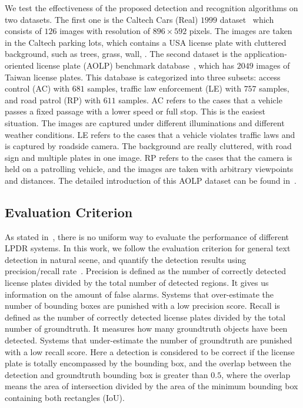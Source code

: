 \documentclass[twocolumn]{svjour3}
\begin{document}
We test the effectiveness of the proposed detection and recognition algorithms on two datasets. The first one is the Caltech Cars (Real) $1999$ dataset~\cite{carmarkus} which consists of $126$ images with resolution of $896 \times 592$ pixels. The images are taken in the Caltech parking lots, which contains a USA license plate with cluttered background, such as trees, grass, wall, \etc. The second dataset is the application-oriented license plate (AOLP) benchmark database~\cite{Hsu2013}, which has $2049$ images of Taiwan license plates. This database is categorized into three subsets: access control (AC) with $681$ samples, traffic law enforcement (LE) with $757$ samples, and road patrol (RP) with $611$ samples. AC refers to the cases that a vehicle passes a fixed passage with a lower speed or full stop. This is the easiest situation. The images are captured under different illuminations and different weather conditions. LE refers to the cases that a vehicle violates traffic laws and is captured by roadside camera. The background are really cluttered, with road sign and multiple plates in one image. RP refers to the cases that the camera is held on a patrolling vehicle, and the images are taken with arbitrary viewpoints and distances. The detailed introduction of this AOLP dataset can be found in~\cite{Hsu2013}.

\subsection{Evaluation Criterion}
As stated in~\cite{Du2013Automatic}, there is no uniform way to evaluate the performance of different LPDR systems. In this work, we follow the evaluation criterion for general text detection in natural scene, and quantify the detection results using precision/recall rate~\cite{icdar2003}. Precision is defined as the number of correctly detected license plates divided by the total number of detected regions. It gives us information on the amount of false alarms. Systems that over-estimate the number of bounding boxes are punished with a low precision score. Recall is defined as the number of correctly detected license plates divided by the total number of groundtruth. It measures how many groundtruth objects have been detected. Systems that under-estimate the number of groundtruth are punished with a low recall score. Here a detection is considered to be correct if the license plate is totally encompassed by the bounding box, and the overlap between the detection and groundtruth bounding box is greater than $0.5$, where the overlap means the area of intersection divided by the area of the minimum bounding box containing both rectangles (IoU).
\end{document}
